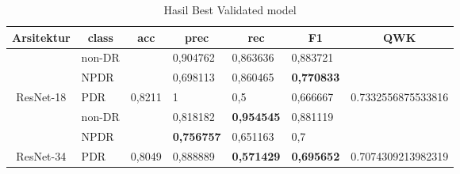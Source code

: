 \pagebreak

\begin{table}[hbtp]
	\begin{center}
		\caption{Hasil Best Validated model}
		\label{tb:HasilValDefault}
		\begin{tabular}{|c|l|c|l|l|l|c|}
			\hline
			\rowcolor[HTML]{C0C0C0} 
			Arsitektur & \multicolumn{1}{c|}{\cellcolor[HTML]{C0C0C0}class} & acc                      & \multicolumn{1}{c|}{\cellcolor[HTML]{C0C0C0}prec} & \multicolumn{1}{c|}{\cellcolor[HTML]{C0C0C0}rec} & \multicolumn{1}{c|}{\cellcolor[HTML]{C0C0C0}F1} & QWK                                  \\ \hline
			& non-DR                                             &                          & 0,904762                                          & 0,863636                                         & 0,883721                                        &                                      \\ \cline{2-2} \cline{4-6}
			& NPDR                                               &                          & 0,698113                                          & 0,860465                                         & \textbf{0,770833}                               &                                      \\ \cline{2-2} \cline{4-6}
			\multirow{-3}{*}{ResNet-18}  & PDR                                                & \multirow{-3}{*}{0,8211} & 1                                                 & 0,5                                              & 0,666667                                        & \multirow{-3}{*}{0.7332556875533816} \\ \hline
			& non-DR                                             &                          & 0,818182                                          & \textbf{0,954545}                                & 0,881119                                        &                                      \\ \cline{2-2} \cline{4-6}
			& NPDR                                               &                          & \textbf{0,756757}                                 & 0,651163                                         & 0,7                                             &                                      \\ \cline{2-2} \cline{4-6}
			\multirow{-3}{*}{ResNet-34}  & PDR                                                & \multirow{-3}{*}{0,8049} & 0,888889                                          & \textbf{0,571429}                                & \textbf{0,695652}                                        & \multirow{-3}{*}{0.7074309213982319} \\ \hline

\end{tabular}
\end{center}
\end{table}
